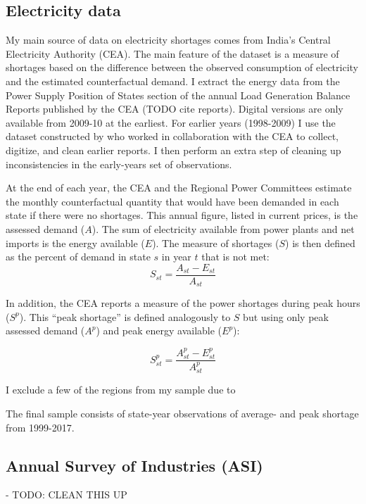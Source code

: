 \documentclass[11pt]{article}
\begin{document}
\subsection{Electricity data}%
\label{sub:energy_data}

My main source of data on electricity shortages comes from India's Central Electricity Authority (CEA). The main feature of the dataset is a measure of shortages based on the difference between the observed consumption of electricity and the estimated counterfactual demand. I extract the energy data from the Power Supply Position of States section of the annual Load Generation Balance Reports published by the CEA (TODO cite reports). Digital versions are only available from 2009-10 at the earliest. For earlier years (1998-2009) I use the dataset constructed by \cite{allcott_how_2016} who worked in collaboration with the CEA to collect, digitize, and clean earlier reports. I then perform an extra step of cleaning up inconsistencies in the early-years set of observations.

At the end of each year, the CEA and the Regional Power Committees estimate the monthly counterfactual quantity that would have been demanded in each state if there were no shortages. This annual figure, listed in current prices, is the assessed demand (\(A\)). The sum of electricity available from power plants and net imports is the energy available ($E$). The measure of shortages (\(S\)) is then defined as the percent of demand in state \(s\) in year \(t\) that is not met:
\[
S_{st} = \frac{A_{st} - E_{st} }{A_{st}}
\]

In addition, the CEA reports a measure of the power shortages during peak hours (\(S^p\)). This ``peak shortage'' is defined analogously to \(S\) but using only peak assessed demand (\(A^{p}\)) and peak energy available (\(E^p\)):

\[
S^{p}_{st} = \frac{A^{p}_{st} - E^{p}_{st}}{A^{p}_{st}}
\]

I exclude a few of the regions from my sample due to 

The final sample consists of state-year observations of average- and peak shortage from 1999-2017.

\subsection{Annual Survey of Industries (ASI)}%
\label{sub:annual_survey_of_industries_asi}

- TODO: CLEAN THIS UP 
\end{document}
